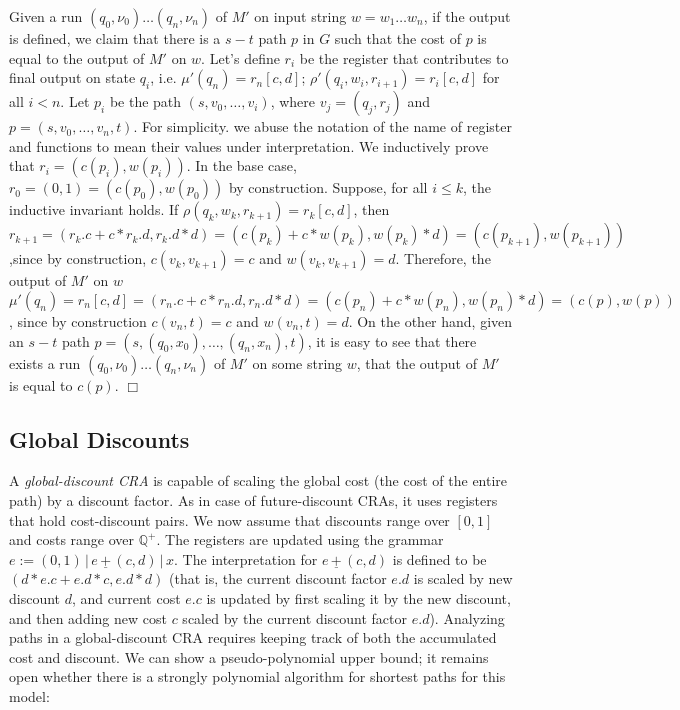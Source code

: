 \documentclass[11pt]{article}
\def\qed{{\bf $\Box$}}
\newcommand{\mypar}[1]{\subsection{#1}}
\def\qed{{\bf $\Box$}}
\newcommand{\posrat}{\ensuremath{\mathbb{Q}^+}}
\newcommand{\sep}{\ensuremath{\,|\,}}
\newcommand{\state}{\ensuremath{q}}
\newcommand{\valuation}{\ensuremath{\nu}}
\newcommand{\edwa}{\ensuremath{M}}
\newcommand{\edwastate}{\ensuremath{q}}
\newcommand{\edwavarup}{\ensuremath{\rho}}
\newcommand{\edwafinal}{\ensuremath{\mu}}
\def\gdplus{\,\underline{+}\,}
\begin{document}
Given a run $(\edwastate_0,\valuation_0)\ldots
(\edwastate_n,\valuation_n)$ of $\edwa'$ on input string $w=w_1\ldots w_n$, if the output is defined,
we claim that there is a $s-t$ path $p$ in $G$ such that the cost of $p$ is equal to the output of $\edwa'$ on $w$.
Let's define $r_i$ be the register that contributes to final output on state $\state_i$,
i.e. $\edwafinal'(\state_n)=r_n[c,d]$; $\edwavarup'(\state_i,w_i,r_{i+1})=r_i[c,d]$ for all $i<n$.
Let $p_i$ be the path $(s,v_0,\ldots,v_i)$, where $v_j=(\state_j,r_j)$ and $p=(s,v_0,\ldots,v_n,t)$.
For simplicity. we abuse the notation of the name of register and functions to mean their values under
interpretation.
We inductively prove that $r_i=(c(p_i),w(p_i))$.
In the base case, $r_0=(0,1)=(c(p_0),w(p_0))$ by construction.
Suppose, for all $i\le k$, the inductive invariant holds.
If $\edwavarup(\state_{k},w_k,r_{k+1})=r_{k}[c,d]$, then
$r_{k+1}=(r_k.c+c*r_k.d,r_k.d*d)=(c(p_k)+c*w(p_k),w(p_k)*d)=(c(p_{k+1}),w(p_{k+1}))$,since by construction,
$c(v_k,v_{k+1})=c$ and $w(v_k,v_{k+1})=d$.
Therefore, the output of $\edwa'$ on $w$ $\edwafinal'(\state_n)=r_n[c,d]=(r_n.c+c*r_n.d,r_n.d*d)=
(c(p_n)+c*w(p_n),w(p_n)*d)=(c(p),w(p))$, since by construction $c(v_n,t)=c$ and $w(v_n,t)=d$.
On the other hand, given an $s-t$ path $p=(s,(\state_0,x_0),\ldots,(\state_n,x_n),t)$,  it is easy to see that there exists a run  $(\edwastate_0,\valuation_0)\ldots
(\edwastate_n,\valuation_n)$ of $\edwa'$ on some string $w$, that the output of $\edwa'$ is equal to $c(p)$.
\qed

\mypar{Global Discounts} A {\em global-discount CRA\/} is capable of
scaling the global cost (the cost of the entire path) by a discount
factor. As in case of future-discount CRAs, it uses registers that
hold cost-discount pairs. We now assume that discounts range over
$[0,1]$ and costs range over $\posrat$. The registers are updated
using the grammar $e:=(0,1)\sep e \gdplus (c,d) \sep x$. The
interpretation for $e\gdplus (c,d)$ is defined to be $(d*e.c+ e.d*c,
e.d*d)$ (that is, the current discount factor $e.d$ is scaled by new
discount $d$, and current cost $e.c$ is updated by first scaling it
by the new discount, and then adding new cost $c$ scaled by the
current discount factor $e.d$). Analyzing paths in a global-discount
CRA requires keeping track of both the accumulated cost and
discount. We can show a pseudo-polynomial upper bound; it remains
open whether there is a strongly polynomial algorithm for shortest
paths for this model:
\end{document}
